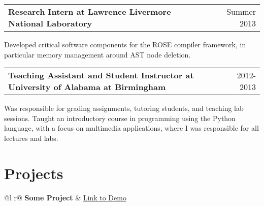 \documentclass[a4paper,12pt]{article}
\makeatletter
\newenvironment{jobshort}[2]
    {
    \begin{tabularx}{\linewidth}{@{}l X r@{}}
    \textbf{#1} & \hfill &  #2 \\[3.75pt]
    \end{tabularx}
    }
    {
    }
\makeatother
\begin{document}
\begin{jobshort}{Research Intern at Lawrence Livermore National Laboratory}{Summer 2013}
Developed critical software components for the ROSE compiler framework, in particular memory management around AST node deletion.
\end{jobshort}

\begin{jobshort}{Teaching Assistant and Student Instructor at University of Alabama at Birmingham}{2012-2013}
Was responsible for grading assignments, tutoring students, and teaching lab sessions. Taught an introductory course in programming using the Python language, with a focus on multimedia applications, where I was responsible for all lectures and labs.
\end{jobshort}
  
\section{Projects}

\begin{tabularx}{\linewidth}{ @{}l r@{} }
\textbf{Some Project} & \hfill \href{https://some-link.com}{Link to Demo} \\[3.75pt]
  \\
\end{tabularx}

\end{document}
